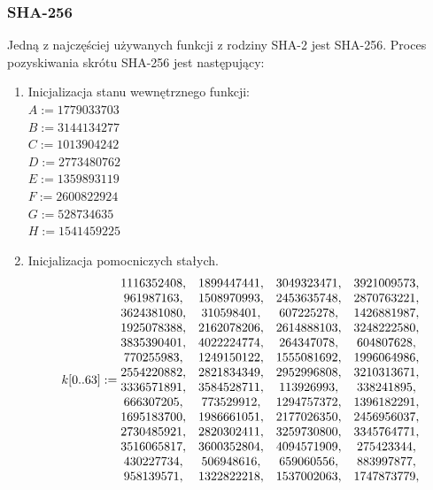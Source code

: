 \subsubsection{SHA-256}
Jedną z najczęściej używanych funkcji z rodziny SHA-2 jest SHA-256. Proces pozyskiwania skrótu SHA-256 jest następujący:
\begin{enumerate}
	\item Inicjalizacja stanu wewnętrznego funkcji: \\
		$A := 1779033703$ \\
		$B := 3144134277$ \\
		$C := 1013904242$ \\
		$D := 2773480762$ \\
		$E := 1359893119$ \\
		$F := 2600822924$ \\
		$G := 528734635$ \\
		$H := 1541459225$
	\item Inicjalizacja pomocniczych stałych. \\
			$$
			k[0..63] := \\
			\begin{matrix}
				1116352408, & 1899447441, & 3049323471, & 3921009573, \\
				961987163,  & 1508970993, & 2453635748, & 2870763221, \\
				3624381080, & 310598401,  & 607225278,  & 1426881987, \\
				1925078388, & 2162078206, & 2614888103, & 3248222580, \\
				3835390401, & 4022224774, & 264347078,  & 604807628,  \\
				770255983,  & 1249150122, & 1555081692, & 1996064986, \\
				2554220882, & 2821834349, & 2952996808, & 3210313671, \\
				3336571891, & 3584528711, & 113926993,  & 338241895,  \\
				666307205,  & 773529912,  & 1294757372, & 1396182291, \\
				1695183700, & 1986661051, & 2177026350, & 2456956037, \\
				2730485921, & 2820302411, & 3259730800, & 3345764771, \\
				3516065817, & 3600352804, & 4094571909, & 275423344,  \\
				430227734,  & 506948616,  & 659060556,  & 883997877,  \\
				958139571,  & 1322822218, & 1537002063, & 1747873779, \\

\end{matrix}$$
\end{enumerate}
